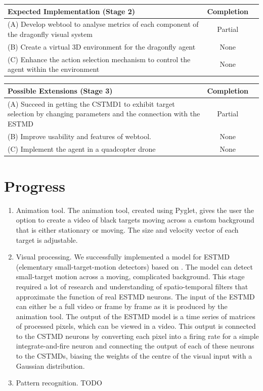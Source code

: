 \documentclass[a4paper,11pt]{article}
\begin{document}
\begin{center}
    \begin{tabular}{p{12cm} c c}
    \textbf{Expected Implementation (Stage 2)} & \textbf{Completion} \\ \hline
	(A) Develop webtool to analyse metrics of each component of the dragonfly visual system & Partial \\
	(B) Create a virtual 3D environment for the dragonfly agent & None\\
	(C) Enhance the action selection mechanism to control the agent within the environment & None\\
    \end{tabular}
\end{center}

\begin{center}
    \begin{tabular}{p{12cm} c c}
    \textbf{Possible Extensions (Stage 3)} & \textbf{Completion} \\ \hline
	(A) Succeed in getting the CSTMD1 to exhibit target selection by changing parameters and the connection with the ESTMD & Partial\\
	(B) Improve usability and features of webtool. & None\\
	(C) Implement the agent in a quadcopter drone & None\\
    \end{tabular}
\end{center}


\section{Progress}

\begin{enumerate}

	\item Animation tool. The animation tool, created using Pyglet, gives the user the option to create a video of black targets moving across a custom background that is either stationary or moving. The size and velocity vector of each target is adjustable.
	\item Visual processing. We successfully implemented a model for ESTMD (elementary small-target-motion detectors) based on \cite{hal11}. The model can detect small-target motion across a moving, complicated background. This stage required a lot of research and understanding of spatio-temporal filters that approximate the function of real ESTMD neurons. The input of the ESTMD can either be a full video or frame by frame as it is produced by the animation tool. The output of the ESTMD model is a time series of matrices of processed pixels, which can be viewed in a video.
This output is connected to the CSTMD neurons by converting each pixel into a firing rate for a simple integrate-and-fire neuron and connecting the output of each of these neurons to the CSTMDs, biasing the weights of the centre of the visual input with a Gaussian distribution.
	\item Pattern recognition. TODO
\end{enumerate}
\end{document}
